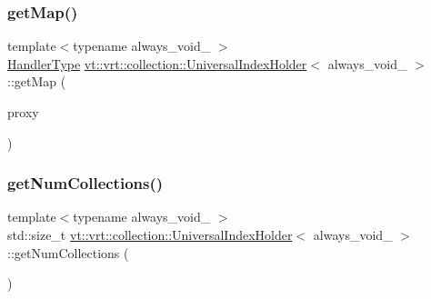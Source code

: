 \mbox{\label{structvt_1_1vrt_1_1collection_1_1_universal_index_holder_aeff5de464c1477e78b8049a7fbec1046}} 
\subsubsection{\texorpdfstring{get\+Map()}{getMap()}}
{\footnotesize\ttfamily template$<$typename always\+\_\+void\+\_\+ $>$ \\
\hyperlink{namespacevt_af64846b57dfcaf104da3ef6967917573}{Handler\+Type} \hyperlink{structvt_1_1vrt_1_1collection_1_1_universal_index_holder}{vt\+::vrt\+::collection\+::\+Universal\+Index\+Holder}$<$ always\+\_\+void\+\_\+ $>$\+::get\+Map (\begin{DoxyParamCaption}\item[{\hyperlink{namespacevt_a1b417dd5d684f045bb58a0ede70045ac}{Virtual\+Proxy\+Type} const}]{proxy }\end{DoxyParamCaption})\hspace{0.3cm}{\ttfamily [static]}}

\mbox{\label{structvt_1_1vrt_1_1collection_1_1_universal_index_holder_a7c8679e3a346a67497402ece0bdd76a8}} 
\subsubsection{\texorpdfstring{get\+Num\+Collections()}{getNumCollections()}}
{\footnotesize\ttfamily template$<$typename always\+\_\+void\+\_\+ $>$ \\
std\+::size\+\_\+t \hyperlink{structvt_1_1vrt_1_1collection_1_1_universal_index_holder}{vt\+::vrt\+::collection\+::\+Universal\+Index\+Holder}$<$ always\+\_\+void\+\_\+ $>$\+::get\+Num\+Collections (\begin{DoxyParamCaption}{ }\end{DoxyParamCaption})\hspace{0.3cm}{\ttfamily [static]}}

